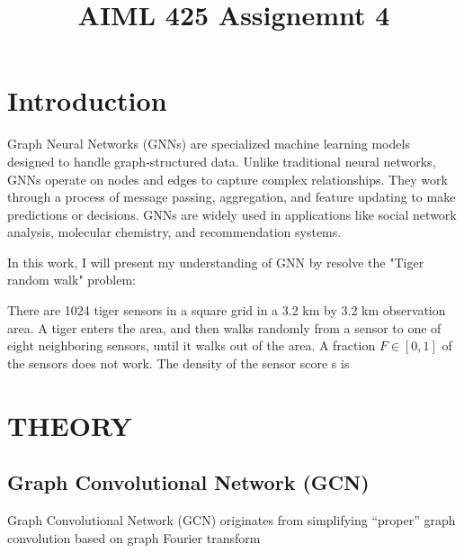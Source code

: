 \documentclass{article}
\title{AIML 425 Assignemnt 4}
\begin{document}
%
\maketitle
%
\section{Introduction}
\label{sec:intro}

Graph Neural Networks (GNNs) are specialized machine learning models designed to handle graph-structured data. Unlike traditional neural networks, GNNs operate on nodes and edges to capture complex relationships. They work through a process of message passing, aggregation, and feature updating to make predictions or decisions. GNNs are widely used in applications like social network analysis, molecular chemistry, and recommendation systems.

In this work, I will present my understanding of GNN by resolve the "Tiger random walk" problem:

There are 1024 tiger sensors in a square grid in a 3.2 km
by 3.2 km observation area. A tiger enters the area, and then
walks randomly from a sensor to one of eight neighboring
sensors, until it walks out of the area. A fraction $F \in [0, 1]$ of
the sensors does not work. The density of the sensor score s is




\section{THEORY}
\label{sec:theory}

\subsection{Graph Convolutional Network (GCN)}
\label{ssec:gcn}
Graph Convolutional Network (GCN) \cite{kipf2016semi} originates from simplifying “proper” graph convolution based on graph Fourier transform
 
\end{document}
